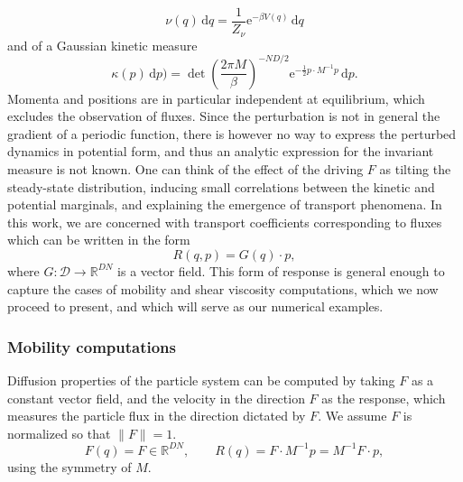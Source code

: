 \documentclass[pdflatex,sn-mathphys]{sn-jnl}%
\theoremstyle{thmstyleone}%
\theoremstyle{thmstyletwo}%
\theoremstyle{thmstylethree}%
\renewcommand{\d}{\mathrm{d}}
\newcommand{\1}{\mathbbm{1}}
\begin{document}
\[\nu(q)\,\d q = \frac1{Z_\nu}\mathrm{e}^{-\beta V(q)}\,\d q\]
and of a Gaussian kinetic measure
\[\kappa(p)\,\d p ) = \operatorname{det}\left(\frac{2\pi M}\beta\right)^{-ND/2}\mathrm{e}^{-\frac12 p\cdot M^{-1}p}\,\d p.\]
Momenta and positions are in particular independent at equilibrium, which excludes the observation of fluxes.
Since the perturbation is not in general the gradient of a periodic function, there is however no way to express the perturbed dynamics in potential form, and thus an analytic expression for the invariant measure is not known. One can think of the effect of the driving $F$ as tilting the steady-state distribution, inducing small correlations between the kinetic and potential marginals, and explaining the emergence of transport phenomena. In this work, we are concerned with transport coefficients corresponding to fluxes which can be written in the form
\begin{equation}
    \label{eq:nemd_response_observable}
    R(q,p)=G(q)\cdot p,
\end{equation}
where $G: \mathcal D \to \mathbb{R}^{DN}$ is a vector field. This form of response is general enough to capture the cases of mobility and shear viscosity computations, which we now proceed to present, and which will serve as our numerical examples.

\subsubsection{Mobility computations}
Diffusion properties of the particle system can be computed by taking $F$ as a constant vector field, and the velocity in the direction $F$ as the response, which measures the particle flux in the direction dictated by $F$. We assume $F$ is normalized so that $\| F \|=1$.
\begin{equation}
    \label{eq:mobility_force_flux}
    F(q) = F\in \mathbb{R}^{DN},\qquad R(q)= F\cdot M^{-1}p = M^{-1}F\cdot p,
\end{equation}
using the symmetry of $M$.
\end{document}

